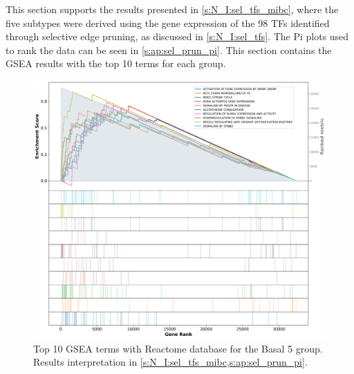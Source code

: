 This section supports the results presented in \cref{s:N_I:sel_tfs_mibc}, where the five subtypes were derived using the gene expression of the 98 TFs identified through selective edge pruning, as discussed in \cref{s:N_I:sel_tfs}. The Pi plots used to rank the data can be seen in \cref{s:ap:sel_prun_pi}. This section contains the GSEA results with the top 10 terms for each group.


\begin{figure}[!htb]
    \centering
    \includegraphics[width=\textwidth,keepaspectratio]{Sections/Network_I/Resources/selective_pruning/gsea/smallBasal_10_top_manTerms.png}
    \caption[Basal 5: GSEA top 10 Reactome terms]{Top 10 GSEA terms with Reactome database for the Basal 5 group. Results interpretation in \cref{s:N_I:sel_tfs_mibc,s:ap:sel_prun_pi}.}
    \label{fig:ap:gsea_smallBasal}
\end{figure}


